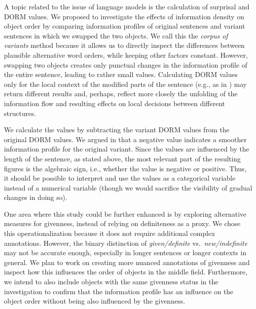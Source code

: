 \documentclass[output=paper,colorlinks,citecolor=brown]{langscibook}
\begin{document}
A topic related to the issue of language models is the calculation of surprisal and DORM values. We proposed to investigate the effects of information density on object order by comparing information profiles of original sentences and variant sentences in which we swapped the two objects. We call this the \textit{corpus of variants} method because it allows us to directly inspect the differences between plausible alternative word orders, while keeping other factors constant. However, swapping two objects creates only punctual changes in the information profile of the entire sentence, leading to rather small \DDIFF values. Calculating DORM values only for the local context of the modified parts of the sentence (e.g., as in ) may return different results and, perhaps, reflect more closely the unfolding of the information flow and resulting effects on local decisions between different structures.

\hspace*{-2mm}We calculate the \DDIFF values by subtracting the variant DORM values from the original DORM values. We argued in  that a negative \DDIFF value indicates a smoother information profile for the original variant. Since the \DDIFF values are influenced by the length of the sentence, as stated above, the most relevant part of the resulting figures is the algebraic sign, i.e., whether the \DDIFF value is negative or positive. Thus, it should be possible to interpret and use the \DDIFF values as a categorical variable instead of a numerical variable (though we would sacrifice the visibility of gradual changes in doing so).

One area where this study could be further enhanced is by exploring alternative measures for givenness, instead of relying on definiteness as a proxy. We chose this operationalization because it does not require additional complex annotations. However, the binary distinction of \textit{given/definite} vs.\ \textit{new/indefi\-nite} may not be accurate enough, especially in longer sentences or longer contexts in general.  We plan to work on creating more nuanced annotations of givenness and inspect how this influences the order of objects in the middle field. Furthermore, we intend to also include objects with the same givenness status in the investigation to confirm that the information profile has an influence on the object order without being also influenced by the givenness.
\end{document}
